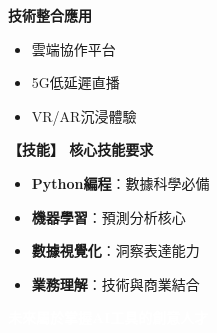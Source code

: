 \documentclass[10pt]{beamer}
\begin{document}
\begin{frame}
\begin{columns}[T]
\begin{column}{0.5\textwidth}
\textbf{技術整合應用}
\begin{itemize}
    \item 雲端協作平台
    \item 5G低延遲直播
    \item VR/AR沉浸體驗
\end{itemize}

\vspace{0.5cm}
\textbf{【技能】 核心技能要求}
\begin{itemize}
    \item \textbf{Python編程}：數據科學必備
    \item \textbf{機器學習}：預測分析核心
    \item \textbf{數據視覺化}：洞察表達能力
    \item \textbf{業務理解}：技術與商業結合
\end{itemize}

\vspace{0.3cm}
\begin{center}
\colorbox{eltablue}{\textcolor{white}{\textbf{未來屬於掌握AI工具的創意人才}}}
\end{center}
\end{column}
\end{columns}

\end{frame}
\end{document}
